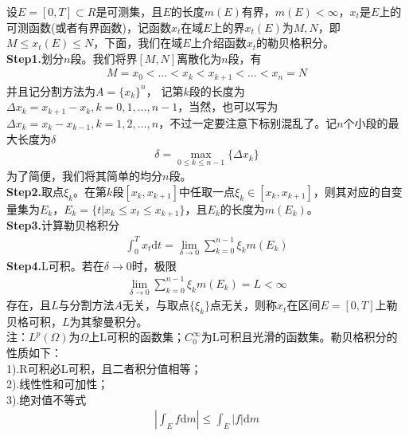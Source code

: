             \par
            设$E = [0,T] \subset R$是可测集，且$E$的长度$m(E)$有界，$m(E)<\infty$，$x_t$是$E$上的可测函数(或者有界函数)，记函数$x_t$在域$E$上的界$x_t(E)$为$M,N$，即$M \leqslant x_t(E) \leqslant N$，下面，我们在域$E$上介绍函数$x_t$的勒贝格积分。\\
            \textbf{Step1.}划分$n$段。我们将界$[M,N]$离散化为$n$段，有
            \begin{align*}
                M = x_0 <\dots <x_k < x_{k+1} <\dots<x_n = N
            \end{align*}
            并且记分割方法为$A = \{x_k\}^n$，
            记第$k$段的长度为$\Delta x_k = x_{k+1}-x_k,k = 0,1,\dots,n - 1$，当然，也可以写为$\Delta x_k = x_{k}-x_{k-1},k = 1,2,\dots,n$，不过一定要注意下标别混乱了。记$n$个小段的最大长度为$\delta$
            \begin{align*}
                \delta = \max_{0 \leqslant k \leqslant n-1}\{\Delta x_k\}
            \end{align*}
            为了简便，我们将其简单的均分$n$段。\\
            \textbf{Step2.}取点$\xi_k$。在第$k$段$[x_{k},x_{k+1}]$中任取一点$\xi_k\in [x_{k},x_{k+1}]$，则其对应的自变量集为$E_k$，$E_k = \{t|x_k \leqslant x_t \leqslant x_{k+1}\}$，且$E_k$的长度为$m(E_k)$。\\
            \textbf{Step3.}计算勒贝格积分
            \begin{align*}
                \int_0^T x_t\mathrm{d}t = \lim_{\delta \rightarrow 0} \sum_{k = 0}^{n-1} \xi_k m(E_k)
            \end{align*}
            \textbf{Step4.}L可积。若在$\delta\rightarrow 0$时，极限
            \begin{align*}
                \lim_{\delta \rightarrow 0} \sum_{k = 0}^{n-1} \xi_k m(E_k) = L<\infty
            \end{align*}
            存在，且$L$与分割方法$A$无关，与取点$\{\xi_k\}$点无关，则称$x_t$在区间$E = [0,T]$上勒贝格可积，$L$为其黎曼积分。\\
            注：$L^p(\Omega)$为$\Omega$上L可积的函数集；$C_0^\infty$为L可积且光滑的函数集。勒贝格积分的性质如下：\\
            1).R可积必L可积，且二者积分值相等；\\
            2).线性性和可加性；\\
            3).绝对值不等式
            \begin{align*}
                \left| \int_E f\mathrm{d}m \right| \leqslant \int_E |f| \mathrm{d}m
            \end{align*}
